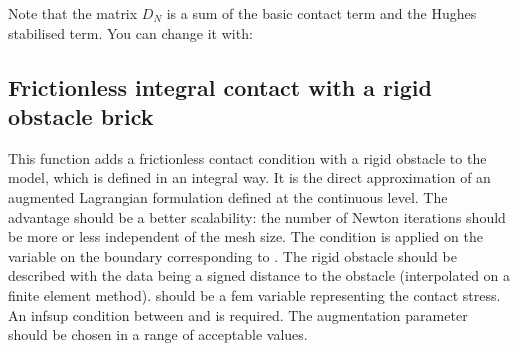\documentclass[a4paper,11pt,english]{sphinxmanual}
\begin{document}
Note that the matrix \(D_N\) is a sum of the basic contact term and the Hughes stabilised term. You can change it with:

\begin{sphinxVerbatim}[commandchars=\\\{\}]
 
\end{sphinxVerbatim}


\subsection{Frictionless integral contact with a rigid obstacle brick}
\label{\detokenize{userdoc/model_contact_friction:frictionless-integral-contact-with-a-rigid-obstacle-brick}}
\begin{sphinxVerbatim}[commandchars=\\\{\}]
             
\end{sphinxVerbatim}

This function adds a frictionless contact condition with a rigid obstacle
to the model, which is defined in an integral way. It is the direct
approximation of an augmented Lagrangian formulation defined at the
continuous level. The advantage should be a better scalability:
the number of
Newton iterations should be more or less independent of the mesh size.
The condition is applied on the variable 
on the boundary corresponding to . The rigid obstacle should
be described with the data  being a signed distance to
the obstacle (interpolated on a finite element method).
 should be a fem variable representing the contact stress.
An inf\sphinxhyphen{}sup condition between  and  is required.
The augmentation parameter  should be chosen in a
range of acceptable values.
\end{document}
